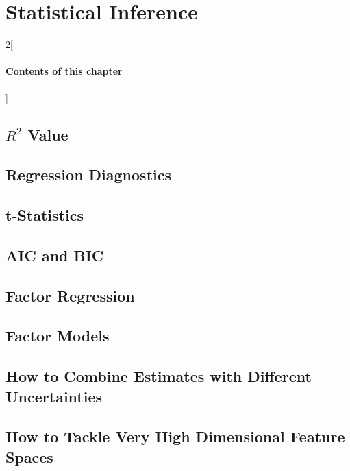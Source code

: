 \chapter{Statistical Inference}
\label{chp:statisticalinference}

\begin{multicols}{2}[\subsubsection*{Contents of this chapter}]
\end{multicols}















\section{$R^2$ Value}

\section{Regression Diagnostics}

\section{t-Statistics}

\section{AIC and BIC}

\section{Factor Regression}

\section{Factor Models}


\section{How to Combine Estimates with Different Uncertainties}

\section{How to Tackle Very High Dimensional Feature Spaces}

